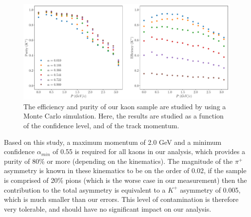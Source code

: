 \begin{figure}
	\centering
	\label{fig:kaon_efficiency_purity}
	\includegraphics[width=15cm]{image/plots/hadron-id/kaon_efficiency_purity.pdf}
	\caption{The efficiency and purity of our kaon sample are studied by using a Monte Carlo simulation.  Here, the results are studied as a function of the confidence level, and of the track momentum.}
\end{figure}

Based on this study, a maximum momentum of 2.0 GeV and a minimum confidence $\alpha_{min}$ of 0.55 is required for all kaons in our analysis, which provides a purity of 80\% or more (depending on the kinematics).  The magnitude of the $\pi^+$ asymmetry is known in these kinematics to be on the order of 0.02, if the sample is comprised of 20\% pions (which is the worse case in our measurement) then the contribution to the total asymmetry is equivalent to a $K^+$ asymmetry of 0.005, which is much smaller than our errors.  This level of contamination is therefore very tolerable, and should have no significant impact on our analysis.  
